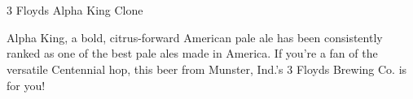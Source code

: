 \part{\styleamericanpaleale}

\begin{recipie}{3 Floyds Alpha King Clone}

\begin{aboutblock}
Alpha King, a bold, citrus-forward American pale ale has been consistently ranked as
one of the best pale ales made in America. If you're a fan of the versatile Centennial
hop, this beer from Munster, Ind.'s 3 Floyds Brewing Co. is for you!
\end{aboutblock}


\begin{methodandtiming}
 
\begin{mashsteps}
\end{mashsteps}

\begin{fermentationsteps}
\end{fermentationsteps}

\end{methodandtiming}

\pagebreak

\begin{ingredientsblock}

\begin{malts}
\end{malts}

\begin{hops}
\end{hops}

\begin{yeasts}
\end{yeasts}

\end{ingredientsblock}

\end{recipie}


